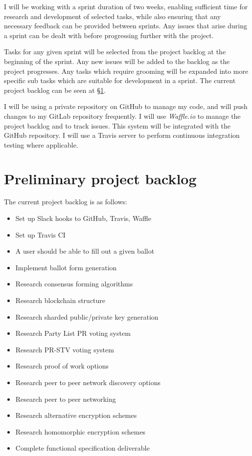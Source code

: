 \documentclass[a4paper,12pt]{article}
\begin{document}
I will be working with a sprint duration of two weeks, enabling sufficient time for research and development of selected tasks, while also ensuring that any necessary feedback can be provided between sprints. Any issues that arise during a sprint can be dealt with before progressing further with the project.

Tasks for any given sprint will be selected from the project backlog at the beginning of the sprint. Any new issues will be added to the backlog as the project progresses. Any tasks which require grooming will be expanded into more specific sub tasks which are suitable for development in a sprint. The current project backlog can be seen at \S\ref{sec:backlog}.

I will be using a private repository on GitHub to manage my code, and will push changes to my GitLab repository frequently. I will use \textit{Waffle.io} to manage the project backlog and to track issues. This system will be integrated with the GitHub repository. I will use a Travis server to perform continuous integration testing where applicable.

\section{Preliminary project backlog}
\label{sec:backlog}

The current project backlog is as follows:
\begin{itemize}
    \item Set up Slack hooks to GitHub, Travis, Waffle
    \item Set up Travis CI
    \item A user should be able to fill out a given ballot
    \item Implement ballot form generation
    \item Research consensus forming algorithms
    \item Research blockchain structure
    \item Research sharded public/private key generation
    \item Research Party List PR voting system
    \item Research PR-STV voting system
    \item Research proof of work options
    \item Research peer to peer network discovery options
    \item Research peer to peer networking
    \item Research alternative encryption schemes
    \item Research homomorphic encryption schemes
    \item Complete functional specification deliverable
\end{itemize}
\newpage
\theendnotes
\end{document}
